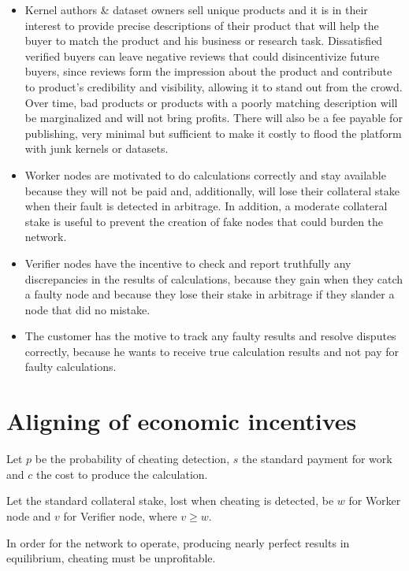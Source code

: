 \documentclass{article}
\begin{document}
\begin{itemize}
\item Kernel authors \& dataset owners sell unique products and it is in
their interest to provide precise descriptions of their product that will
help the buyer to match the product and his business or research task.
Dissatisfied verified buyers can leave negative reviews that could
disincentivize future buyers, since reviews form the impression about the
product and contribute to product's credibility and visibility, allowing it
to stand out from the crowd. Over time, bad products or products with a
poorly matching description will be marginalized and will not bring profits.
There will also be a fee payable for publishing, very minimal but sufficient
to make it costly to flood the platform with junk kernels or datasets.

\item Worker nodes are motivated to do calculations correctly and stay
available because they will not be paid and, additionally, will lose their
collateral stake when their fault is detected in arbitrage. In addition, a
moderate collateral stake is useful to prevent the creation of fake nodes
that could burden the network.

\item Verifier nodes have the incentive to check and report truthfully any
discrepancies in the results of calculations, because they gain when they
catch a faulty node and because they lose their stake in arbitrage if they
slander a node that did no mistake.

\item The customer has the motive to track any faulty results and resolve
disputes correctly, because he wants to receive true calculation results and
not pay for faulty calculations.
\end{itemize}

\section{Aligning of economic incentives}

Let $p$ be the probability of cheating detection, $s$ the standard payment
for work and $c$ the cost to produce the calculation.

Let the standard collateral stake, lost when cheating is detected, be $w$
for Worker node and $v$ for Verifier node, where $v\geq w$.

In order for the network to operate, producing nearly perfect results in
equilibrium, cheating must be unprofitable.
\end{document}

